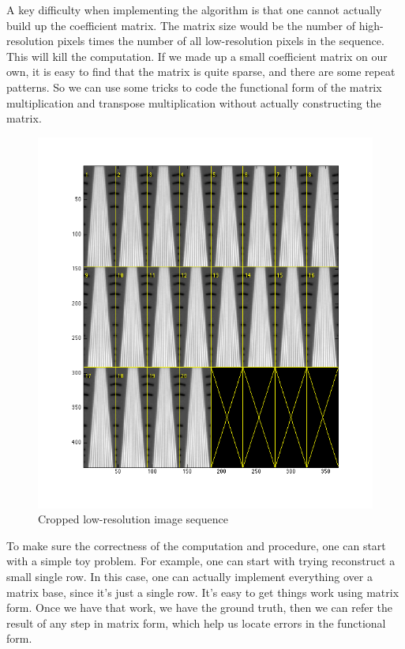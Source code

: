 \documentclass{article}
\begin{document}
A key difficulty when implementing the algorithm is that one cannot actually build up the coefficient matrix. The matrix size would be the number of high-resolution pixels times the number of all low-resolution pixels in the sequence. This will kill the computation. If we made up a small coefficient matrix on our own, it is easy to find that the matrix is quite sparse, and there are some repeat patterns. So we can use some tricks to code the functional form of the matrix multiplication and transpose multiplication without actually constructing the matrix. 

\begin{figure}[H]
\centering
\includegraphics[width = 1.0\textwidth]{data_cropped}
\caption{Cropped low-resolution image sequence} \label{crop}
\end{figure}

To make sure the correctness of the computation and procedure, one can start with a simple toy problem. For example, one can start with
trying reconstruct a small single row. In this case, one can actually implement everything over a matrix base, since it's just a single row. It's easy to get things work using matrix form. Once we have that work, we have the ground truth, then we can refer the result of any step in matrix form, which help us locate errors in the functional form. 
\end{document}

